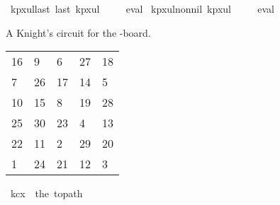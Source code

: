 \begin{isabellebody}
%
\isadelimproof
%
\endisadelimproof
\isanewline
\isanewline
{}\isamarkupfalse%
\ kp{\isacharunderscore}{\kern0pt}{}x{}{\isacharunderscore}{\kern0pt}ul{\isacharunderscore}{\kern0pt}last{\isacharcolon}{\kern0pt}\ {\isachardoublequoteopen}last\ kp{}x{}ul\ {\isacharequal}{\kern0pt}\ {\isacharparenleft}{\kern0pt}{}{\isacharcomma}{\kern0pt}{}{\isacharparenright}{\kern0pt}{\isachardoublequoteclose}%
\isadelimproof
\ %
\endisadelimproof
%
\isatagproof
{}\isamarkupfalse%
\ eval%
\endisatagproof
{\isafoldproof}%
%
\isadelimproof
%
\endisadelimproof
\isanewline
\isanewline
{}\isamarkupfalse%
\ kp{\isacharunderscore}{\kern0pt}{}x{}{\isacharunderscore}{\kern0pt}ul{\isacharunderscore}{\kern0pt}non{\isacharunderscore}{\kern0pt}nil{\isacharcolon}{\kern0pt}\ {\isachardoublequoteopen}kp{}x{}ul\ {\isasymnoteq}\ {\isacharbrackleft}{\kern0pt}{\isacharbrackright}{\kern0pt}{\isachardoublequoteclose}%
\isadelimproof
\ %
\endisadelimproof
%
\isatagproof
{}\isamarkupfalse%
\ eval%
\endisatagproof
{\isafoldproof}%
%
\isadelimproof
%
\endisadelimproof
%
\begin{isamarkuptext}%
A Knight's circuit for the -board.
  \begin{table}[H]
    \begin{tabular}{lllll}
      16 &  9 &  6 & 27 & 18 \\
       7 & 26 & 17 & 14 &  5 \\
      10 & 15 &  8 & 19 & 28 \\
      25 & 30 & 23 &  4 & 13 \\
      22 & 11 &  2 & 29 & 20 \\
       1 & 24 & 21 & 12 &  3
    \end{tabular}
  \end{table}%
\end{isamarkuptext}\isamarkuptrue%
\isamarkupfalse%
\ {\isachardoublequoteopen}kc{}x{}\ {\isasymequiv}\ the\ {\isacharparenleft}{\kern0pt}to{\isacharunderscore}{\kern0pt}path\ \isanewline
\ \ {\isacharbrackleft}{\kern0pt}{\isacharbrackleft}{\kern0pt}{}{}{\isacharcomma}{\kern0pt}{}{\isacharcomma}{\kern0pt}{}{\isacharcomma}{\kern0pt}{}{}{\isacharcomma}{\kern0pt}{}{}{\isacharbrackright}{\kern0pt}{\isacharcomma}{\kern0pt}\isanewline

\end{isabellebody}
